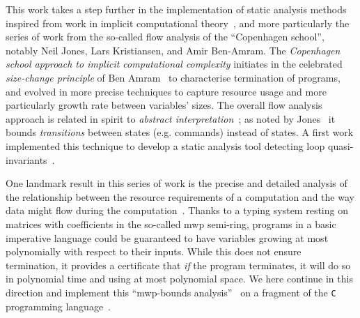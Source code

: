 \documentclass[runningheads]{llncs}
\makeatletter
\newcommand*{\eg}{e.g.\@\xspace}
\makeatother
\begin{document}
This work takes a step further in the implementation of static analysis methods inspired from work in implicit computational theory~\cite{DalLago2012a}, and more particularly the series of work from the so-called flow analysis of the \enquote{Copenhagen school}, notably Neil Jones, Lars Kristiansen, and Amir Ben-Amram. The \emph{Copenhagen school approach to implicit computational complexity} initiates in the celebrated \emph{size-change principle} of Ben Amram~\cite{Ben-Amram2008} to characterise termination of programs, and evolved in more precise techniques to capture resource usage and more particularly growth rate between variables' sizes.
The overall flow analysis approach is related in spirit to \emph{abstract interpretation}~\cite{Cousot1977b,Cousot1977a}; as noted by Jones~\cite{Jones1995} it bounds \emph{transitions} between states (\eg commands) instead of states. A first work implemented this technique to develop a static analysis tool detecting loop quasi-invariants~\cite{Moyen2017,Moyen2017b}.

One landmark result in this series of work is the precise and detailed analysis of the relationship between the resource requirements of a computation and the way data might flow during the computation~\cite{Jones2009}.
Thanks to a typing system resting on matrices with coefficients in the so-called mwp semi-ring, programs in a basic imperative language could be guaranteed to have variables growing at most polynomially with respect to their inputs. While this does not ensure termination, it provides a certificate that \emph{if} the program terminates, it will do so in polynomial time and using at most polynomial space.
We here continue in this direction and implement this \enquote{mwp-bounds analysis}~\cite{Jones2009} on a fragment of the \texttt{C} programming language~\cite{Aubert2021f}.
\end{document}
